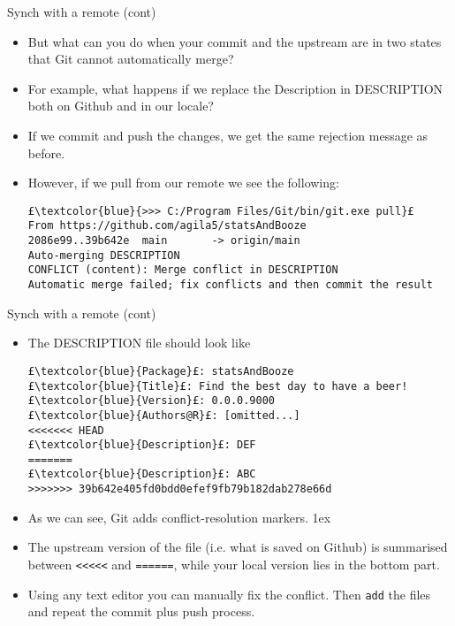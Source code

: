 \documentclass[
hyperref={bookmarks=false},
xcolor={dvipsnames,svgnames*,x11names*}, 
12pt
]{beamer}
\begin{document}
\begin{frame}[fragile]{Synch with a remote (cont)}
\vspace{-0.5cm}
\begin{itemize}
\itemsep 1ex
\item But what can you do when your commit and the upstream are in two states that Git cannot automatically merge? 
\item For example, what happens if we replace the Description in DESCRIPTION both on Github and in our locale? 
\item If we commit and push the changes, we get the same rejection message as before. 
\item However, if we pull from our remote we see the following: 
\begin{lstlisting}
£\textcolor{blue}{>>> C:/Program Files/Git/bin/git.exe pull}£
From https://github.com/agila5/statsAndBooze
2086e99..39b642e  main       -> origin/main
Auto-merging DESCRIPTION
CONFLICT (content): Merge conflict in DESCRIPTION
Automatic merge failed; fix conflicts and then commit the result
\end{lstlisting}
\end{itemize}
\end{frame}

\begin{frame}[fragile]{Synch with a remote (cont)}
\vspace{-0.5cm}
\begin{itemize}
\itemsep 0ex
\item The DESCRIPTION file should look like
\begin{lstlisting}
£\textcolor{blue}{Package}£: statsAndBooze
£\textcolor{blue}{Title}£: Find the best day to have a beer!
£\textcolor{blue}{Version}£: 0.0.0.9000
£\textcolor{blue}{Authors@R}£: [omitted...]
<<<<<<< HEAD
£\textcolor{blue}{Description}£: DEF
=======
£\textcolor{blue}{Description}£: ABC
>>>>>>> 39b642e405fd0bdd0efef9fb79b182dab278e66d
\end{lstlisting}
\item As we can see, Git adds conflict-resolution markers.
\itemsep 1ex
\item The upstream version of the file (i.e. what is saved on Github) is summarised between \texttt{<<<<<} and \texttt{======}, while your local version lies in the bottom part. 
\item Using any text editor you can manually fix the conflict. Then \texttt{add} the files and repeat the commit plus push process. 
\end{itemize}
\end{frame}
\end{document}
